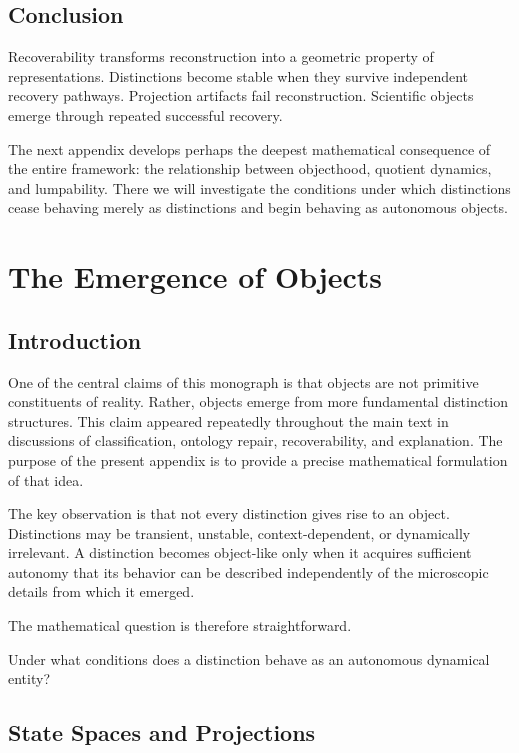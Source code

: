 \documentclass[11pt,oneside,openany]{book}
\begin{document}
\section{Conclusion}

Recoverability transforms reconstruction into a geometric property of representations. Distinctions become stable when they survive independent recovery pathways. Projection artifacts fail reconstruction. Scientific objects emerge through repeated successful recovery.

The next appendix develops perhaps the deepest mathematical consequence of the entire framework: the relationship between objecthood, quotient dynamics, and lumpability. There we will investigate the conditions under which distinctions cease behaving merely as distinctions and begin behaving as autonomous objects.

\chapter{The Emergence of Objects}

\section{Introduction}

One of the central claims of this monograph is that objects are not primitive constituents of reality. Rather, objects emerge from more fundamental distinction structures. This claim appeared repeatedly throughout the main text in discussions of classification, ontology repair, recoverability, and explanation. The purpose of the present appendix is to provide a precise mathematical formulation of that idea.

The key observation is that not every distinction gives rise to an object. Distinctions may be transient, unstable, context-dependent, or dynamically irrelevant. A distinction becomes object-like only when it acquires sufficient autonomy that its behavior can be described independently of the microscopic details from which it emerged.

The mathematical question is therefore straightforward.

Under what conditions does a distinction behave as an autonomous dynamical entity?

\section{State Spaces and Projections}
\end{document}
